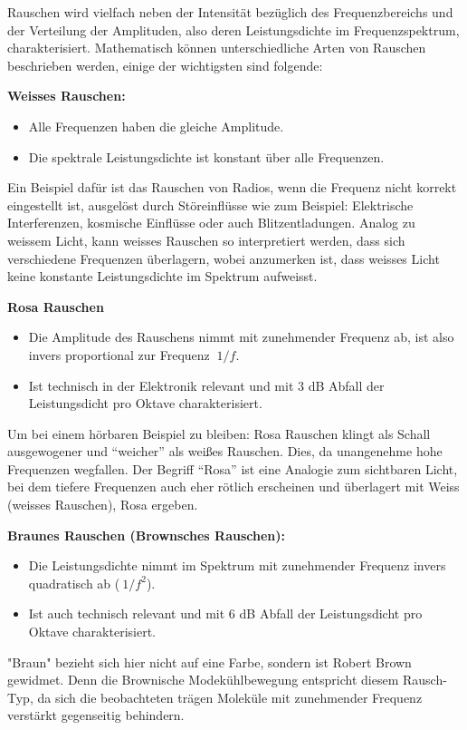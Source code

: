 Rauschen wird vielfach neben der Intensität bezüglich des Frequenzbereichs und der Verteilung der Amplituden, also deren Leistungsdichte im Frequenzspektrum, charakterisiert.
Mathematisch können unterschiedliche Arten von Rauschen beschrieben werden, einige der wichtigsten sind folgende: 

\begin{definition}{\bf Weisses Rauschen:}
	\begin{itemize}
		\item Alle Frequenzen haben die gleiche Amplitude.
		\item Die spektrale Leistungsdichte ist konstant über alle Frequenzen. 
	\end{itemize}
\end{definition}
Ein Beispiel dafür ist das Rauschen von Radios, wenn die Frequenz nicht korrekt eingestellt ist, ausgelöst durch Störeinflüsse wie zum Beispiel: Elektrische Interferenzen, kosmische Einflüsse oder auch Blitzentladungen. Analog zu weissem Licht, kann weisses Rauschen so interpretiert werden, dass sich verschiedene Frequenzen überlagern, wobei anzumerken ist, dass weisses Licht keine konstante Leistungsdichte im Spektrum aufweisst.

\begin{definition}{\bf Rosa Rauschen}
	\begin{itemize}
		\item Die Amplitude des Rauschens nimmt mit zunehmender Frequenz ab, ist also invers proportional zur Frequenz $ ~1/f $.
		\item Ist technisch in der Elektronik relevant und mit 3 dB Abfall der Leistungsdicht pro Oktave charakterisiert.
	\end{itemize}
\end{definition}
	Um bei einem hörbaren Beispiel zu bleiben: Rosa Rauschen klingt als Schall ausgewogener und ``weicher'' als weißes Rauschen. Dies, da unangenehme hohe Frequenzen wegfallen. Der Begriff ``Rosa'' ist eine Analogie zum sichtbaren Licht, bei dem tiefere Frequenzen auch eher rötlich erscheinen und überlagert mit Weiss (weisses Rauschen), Rosa ergeben.

\begin{definition}{\bf Braunes Rauschen (Brownsches Rauschen):}
	\begin{itemize}
		\item Die Leistungsdichte nimmt im Spektrum mit zunehmender Frequenz invers quadratisch ab ($ ~1/f^2 $).
		\item Ist auch technisch relevant und mit 6 dB Abfall der Leistungsdicht pro Oktave charakterisiert.
	\end{itemize}
\end{definition}
"Braun" bezieht sich hier nicht auf eine Farbe, sondern ist Robert Brown gewidmet. Denn die Brownische Modekühlbewegung entspricht diesem Rausch-Typ, da sich die beobachteten trägen Moleküle mit zunehmender Frequenz verstärkt gegenseitig behindern.


